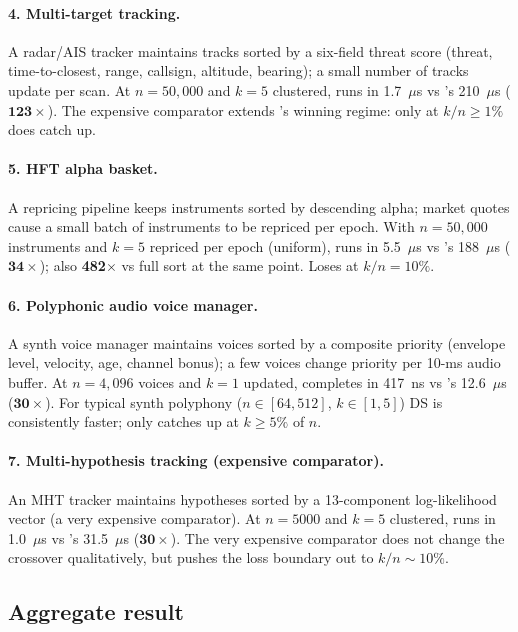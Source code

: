 \paragraph{4. Multi-target tracking.}
A radar/AIS tracker maintains tracks sorted by a six-field threat score
(threat, time-to-closest, range, callsign, altitude, bearing); a small
number of tracks update per scan. At $n{=}50{,}000$ and $k{=}5$ clustered,
\DeltaSort runs in 1.7~$\mu$s vs \ESM's 210~$\mu$s ($\mathbf{123\times}$).
The expensive comparator extends \DeltaSort's winning regime: only at
$k/n \geq 1\%$ does \ESM catch up.

\paragraph{5. HFT alpha basket.}
A repricing pipeline keeps instruments sorted by descending alpha; market
quotes cause a small batch of instruments to be repriced per epoch. With
$n{=}50{,}000$ instruments and $k{=}5$ repriced per epoch (uniform), \DeltaSort
runs in 5.5~$\mu$s vs \ESM's 188~$\mu$s ($\mathbf{34\times}$); also
\textbf{482$\times$} vs full sort at the same point. Loses at $k/n {=} 10\%$.

\paragraph{6. Polyphonic audio voice manager.}
A synth voice manager maintains voices sorted by a composite priority
(envelope level, velocity, age, channel bonus); a few voices change priority
per 10-ms audio buffer. At $n{=}4{,}096$ voices and $k{=}1$ updated,
\DeltaSort completes in 417~ns vs \ESM's 12.6~$\mu$s ($\mathbf{30\times}$).
For typical synth polyphony ($n \in [64, 512]$, $k \in [1, 5]$) DS is
consistently faster; \ESM only catches up at $k \geq 5\%$ of $n$.

\paragraph{7. Multi-hypothesis tracking (expensive comparator).}
An MHT tracker maintains hypotheses sorted by a 13-component
log-likelihood vector (a very expensive comparator). At $n{=}5000$ and
$k{=}5$ clustered, \DeltaSort runs in 1.0~$\mu$s vs \ESM's 31.5~$\mu$s
($\mathbf{30\times}$). The very expensive comparator does not change
the crossover qualitatively, but pushes the loss boundary out to
$k/n {\sim} 10\%$.

\subsection*{Aggregate result}

